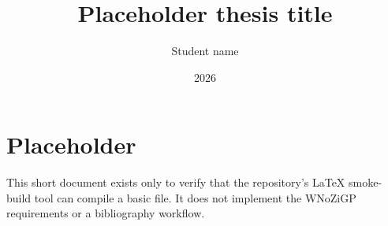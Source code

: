 \documentclass[a4paper,12pt]{report}
\title{Placeholder thesis title}
\author{Student name}
\date{2026}
\begin{document}
\maketitle

\chapter{Placeholder}
This short document exists only to verify that the repository's LaTeX
smoke-build tool can compile a basic file. It does not implement the
WNoZiGP requirements or a bibliography workflow.
\end{document}
